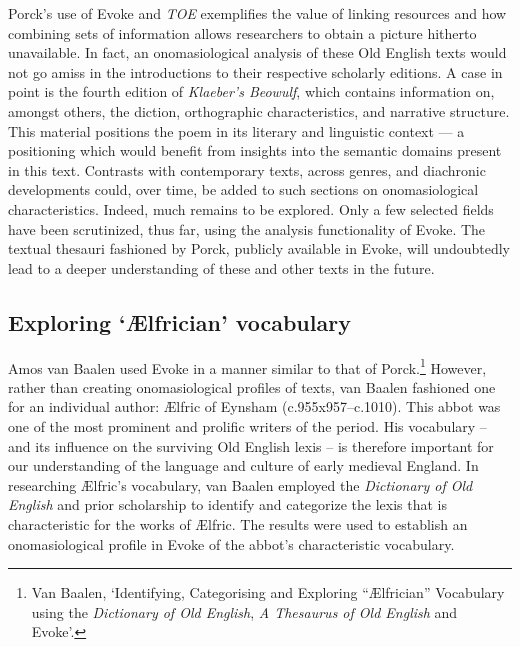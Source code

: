 Porck's use of Evoke and \textit{TOE} exemplifies the value of linking resources and how combining sets of information allows researchers to obtain a picture hitherto unavailable. In fact, an onomasiological analysis of these Old English texts would not go amiss in the introductions to their respective scholarly editions. A case in point is the fourth edition of \textit{Klaeber's Beowulf}, which contains information on, amongst others, the diction, orthographic characteristics, and narrative structure. This material positions the poem in its literary and linguistic context --- a positioning which would benefit from insights into the semantic domains present in this text. Contrasts with contemporary texts, across genres, and diachronic developments could, over time, be added to such sections on onomasiological characteristics. Indeed, much remains to be explored. Only a few selected fields have been scrutinized, thus far, using the analysis functionality of Evoke. The textual thesauri fashioned by Porck, publicly available in Evoke, will undoubtedly lead to a deeper understanding of these and other texts in the future.



\subsection{Exploring `Ælfrician' vocabulary}

Amos van Baalen used Evoke in a manner similar to that of Porck.\footnote{Van Baalen, `Identifying, Categorising and Exploring ``Ælfrician'' Vocabulary using the \textit{Dictionary of Old English}, \textit{A Thesaurus of Old English} and Evoke'.} %
However, rather than creating onomasiological profiles of texts, van Baalen fashioned one for an individual author: Ælfric of Eynsham (c.955x957–c.1010). This abbot was one of the most prominent and prolific writers of the period. His vocabulary -- and its influence on the surviving Old English lexis -- is therefore important for our understanding of the language and culture of early medieval England. In researching Ælfric's vocabulary, van Baalen employed the \textit{Dictionary of Old English} and prior scholarship to identify and categorize the lexis that is characteristic for the works of Ælfric. The results were used to establish an onomasiological profile in Evoke of the abbot's characteristic vocabulary.

